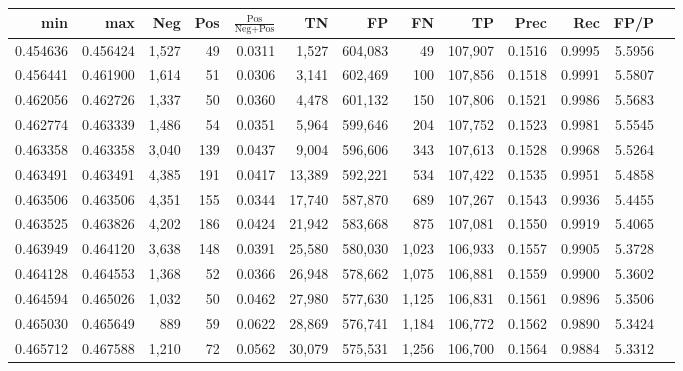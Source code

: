 \begin{tabular}{rrrrrrrrrrrrr}
\toprule
     min &      max &   Neg &   Pos & $\frac{\text{Pos}}{\text{Neg}+\text{Pos}}$ &      TN &      FP &      FN &      TP &   Prec &    Rec &   FP/P \\
\midrule
0.454636 & 0.456424 & 1,527 &    49 &                                     0.0311 &   1,527 & 604,083 &      49 & 107,907 & 0.1516 & 0.9995 & 5.5956 \\
0.456441 & 0.461900 & 1,614 &    51 &                                     0.0306 &   3,141 & 602,469 &     100 & 107,856 & 0.1518 & 0.9991 & 5.5807 \\
0.462056 & 0.462726 & 1,337 &    50 &                                     0.0360 &   4,478 & 601,132 &     150 & 107,806 & 0.1521 & 0.9986 & 5.5683 \\
0.462774 & 0.463339 & 1,486 &    54 &                                     0.0351 &   5,964 & 599,646 &     204 & 107,752 & 0.1523 & 0.9981 & 5.5545 \\
0.463358 & 0.463358 & 3,040 &   139 &                                     0.0437 &   9,004 & 596,606 &     343 & 107,613 & 0.1528 & 0.9968 & 5.5264 \\
0.463491 & 0.463491 & 4,385 &   191 &                                     0.0417 &  13,389 & 592,221 &     534 & 107,422 & 0.1535 & 0.9951 & 5.4858 \\
0.463506 & 0.463506 & 4,351 &   155 &                                     0.0344 &  17,740 & 587,870 &     689 & 107,267 & 0.1543 & 0.9936 & 5.4455 \\
0.463525 & 0.463826 & 4,202 &   186 &                                     0.0424 &  21,942 & 583,668 &     875 & 107,081 & 0.1550 & 0.9919 & 5.4065 \\
0.463949 & 0.464120 & 3,638 &   148 &                                     0.0391 &  25,580 & 580,030 &   1,023 & 106,933 & 0.1557 & 0.9905 & 5.3728 \\
0.464128 & 0.464553 & 1,368 &    52 &                                     0.0366 &  26,948 & 578,662 &   1,075 & 106,881 & 0.1559 & 0.9900 & 5.3602 \\
0.464594 & 0.465026 & 1,032 &    50 &                                     0.0462 &  27,980 & 577,630 &   1,125 & 106,831 & 0.1561 & 0.9896 & 5.3506 \\
0.465030 & 0.465649 &   889 &    59 &                                     0.0622 &  28,869 & 576,741 &   1,184 & 106,772 & 0.1562 & 0.9890 & 5.3424 \\
0.465712 & 0.467588 & 1,210 &    72 &                                     0.0562 &  30,079 & 575,531 &   1,256 & 106,700 & 0.1564 & 0.9884 & 5.3312 \\

\end{tabular}
